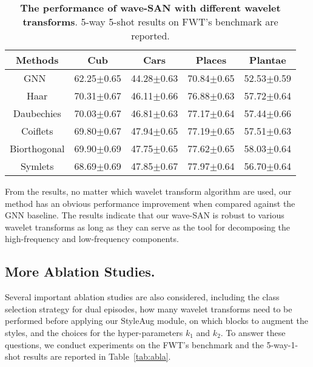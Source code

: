 \documentclass{article}
\newcommand{\mypm}{\scriptsize$\pm$}
\begin{document}
\begin{table}[h] \small
\begin{center}
\begin{tabular} { c c c c c}
	\hline
	\textbf{Methods} & \textbf{Cub} & \textbf{Cars} & \textbf{Places} & \textbf{Plantae} \\
	\hline
	GNN~\cite{garcia2017few} &  62.25\mypm0.65 & 44.28\mypm0.63 & 70.84\mypm0.65 & 52.53\mypm0.59 \\
	\hline
	Haar & 70.31\mypm0.67 & 46.11\mypm0.66 & 76.88\mypm0.63 & 57.72\mypm0.64 \\
	\hline
	Daubechies     & 70.03\mypm0.67 & 46.81\mypm0.63 & 77.17\mypm0.64 & 57.44\mypm0.66 \\
	\hline
	Coiflets   &  69.80\mypm0.67 & 47.94\mypm0.65 & 77.19\mypm0.65 & 57.51\mypm0.63 \\
	\hline
	Biorthogonal & 69.90\mypm0.69 & 47.75\mypm0.65 & 77.62\mypm0.65 & 58.03\mypm0.64 \\
	\hline
	Symlets & 68.69\mypm0.69 & 47.85\mypm0.67 & 77.97\mypm0.64 & 56.70\mypm0.64 \\
	\hline
	\end{tabular}
	\end{center}
\caption{\textbf{The performance of wave-SAN with different wavelet transforms}. 5-way 5-shot results on FWT's benchmark are reported.}
\label{tab:waveletAlor}
\end{table}

From the results, no matter which wavelet transform algorithm are used, our method has an obvious performance improvement when compared against the GNN baseline. The results indicate that our wave-SAN is robust to various wavelet transforms as long as they can serve as the tool for decomposing the high-frequency and low-frequency components.


\subsection{More Ablation Studies.}
Several important ablation studies are also considered, including the class selection strategy for dual episodes, how many wavelet transforms need to be performed before applying our StyleAug module, on which blocks to augment the styles, and the choices for the hyper-parameters $k_1$ and $k_2$. To answer these questions, we conduct experiments on the FWT's benchmark and the 5-way-1-shot results are reported in Table~\ref{tab:abla}.
\end{document}
